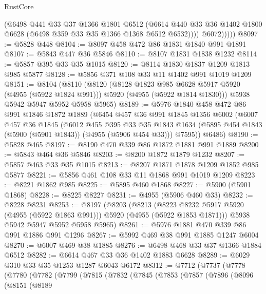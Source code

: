 \begin{lexlean}{RustCore}
\begin{coremodule}
                (@6498
                  @441
                  @33
                  @37
                  @1366
                  @1801
                  @6512
                  (@6614
                    @440
                    @33
                    @36
                    @1402
                    @1800
                    @6628
                    (@6498 @359 @33 @35 @1366 @1368 @6512 @6532))))
              @6072)))))
@8097 := @5828 @448
@8104 := @8097 @458 @472 @86 @1831 @1840 @991 @1891
@8107 := @5843 @447 @36 @5846
@8110 := @8107 @1831 @1838 @1232
@8114 := @5857 @395 @33 @35 @1015
@8120 := @8114 @1830 @1837 @1209 @1813 @985 @5877
@8128 := @5856 @371 @108 @33 @11 @1402 @991 @1019 @1209
@8151 := @8104
    (@8110
      (@8120
        (@8128 @1823 @985 @6628 @5917 @5920 (@4955 (@5922 @1824 @991)))
        @5920
        (@4955 (@5922 @1814 @1830)))
      @5938
      @5942
      @5947
      @5952
      @5958
      @5965)
@8189 := @5976
    @1840
    @458
    @472
    @86
    @991
    @1846
    @1872
    @1889
    (@6454
      @457
      @36
      @991
      @1845
      @1356
      @6002
      (@6007
        @457
        @36
        @1845
        (@6012
          @455
          @395
          @33
          @35
          @1843
          @1634
          (@5895 @454 @1843 (@5900 (@5901 @1843)) (@4955 (@5906 @454 @33)))
          @7595))
      @6486)
@8190 := @5828 @465
@8197 := @8190 @470 @339 @86 @1872 @1881 @991 @1889
@8200 := @5843 @464 @36 @5846
@8203 := @8200 @1872 @1879 @1232
@8207 := @5857 @463 @33 @35 @1015
@8213 := @8207 @1871 @1878 @1209 @1852 @985 @5877
@8221 := @5856 @461 @108 @33 @11 @1868 @991 @1019 @1209
@8223 := @8221 @1862 @985
@8225 := @5895 @460 @1868
@8227 := @5900 (@5901 @1868)
@8228 := @8225 @8227
@8231 := @4955 (@5906 @460 @33)
@8232 := @8228 @8231
@8253 := @8197
    (@8203
      (@8213 (@8223 @8232 @5917 @5920 (@4955 (@5922 @1863 @991))) @5920 (@4955 (@5922 @1853 @1871)))
      @5938
      @5942
      @5947
      @5952
      @5958
      @5965)
@8261 := @5976 @1881 @470 @339 @86 @991 @1886 @991 @1296
@8267 := @5992 @469 @38 @991 @1885 @1247 @6004
@8270 := @6007 @469 @38 @1885
@8276 := @6498 @468 @33 @37 @1366 @1884 @6512
@8282 := @6614 @467 @33 @36 @1402 @1883 @6628
@8289 := @6029 @310 @33 @35 @1253 @1287 @6043 @6172
@8312 := @7712
    (@7737
      (@7778
        (@7780
          (@7782
            (@7799
              (@7815
                (@7832
                  (@7845
                    (@7853
                      (@7857
                        (@7896
                          (@8096
                            (@8151
                              (@8189

\end{coremodule}
\end{lexlean}
